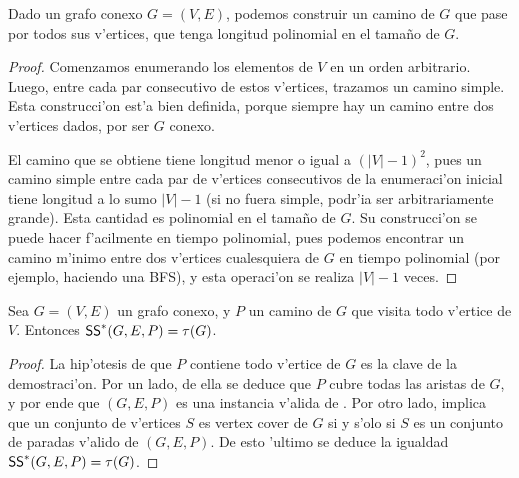 \begin{lemma}
\label{le:camino_con_todos_los_vertices}
Dado un grafo conexo $G = (V, E)$, podemos construir un camino de $G$ que pase por todos sus v'ertices, que tenga longitud polinomial en el tama\~no de $G$.

\begin{proof}
Comenzamos enumerando los elementos de $V$ en un orden arbitrario. Luego, entre cada par consecutivo de estos v'ertices, trazamos un camino simple. Esta construcci'on est'a bien definida, porque siempre hay un camino entre dos v'ertices dados, por ser $G$ conexo.

El camino que se obtiene tiene longitud menor o igual a $(|V| - 1)^2$, pues un camino simple entre cada par de v'ertices consecutivos de la enumeraci'on inicial tiene longitud a lo sumo $|V| - 1$ (si no fuera simple, podr'ia ser arbitrariamente grande). Esta cantidad es polinomial en el tama\~no de $G$. Su construcci'on se puede hacer f'acilmente en tiempo polinomial, pues podemos encontrar un camino m'inimo entre dos v'ertices cualesquiera de $G$ en tiempo polinomial (por ejemplo, haciendo una BFS), y esta operaci'on se realiza $|V| - 1$ veces.
\end{proof}
\end{lemma}

\begin{lemma}
\label{le:igualdad_ss_tau}
Sea $G = (V, E)$ un grafo conexo, y $P$ un camino de $G$ que visita todo v'ertice de $V$. Entonces $\textnormal{\textsf{SS}}^*(G, E, P) = \tau(G)$.

\begin{proof}
La hip'otesis de que $P$ contiene todo v'ertice de $G$ es la clave de la demostraci'on. Por un lado, de ella se deduce que $P$ cubre todas las aristas de $G$, y por ende que $(G, E, P)$ es una instancia v'alida de . Por otro lado, implica que un conjunto de v'ertices $S$ es vertex cover de $G$ si y s'olo si $S$ es un conjunto de paradas v'alido de $(G, E, P)$. De esto 'ultimo se deduce la igualdad $\textnormal{\textsf{SS}}^*(G, E, P) = \tau(G)$.
\end{proof}
\end{lemma}

